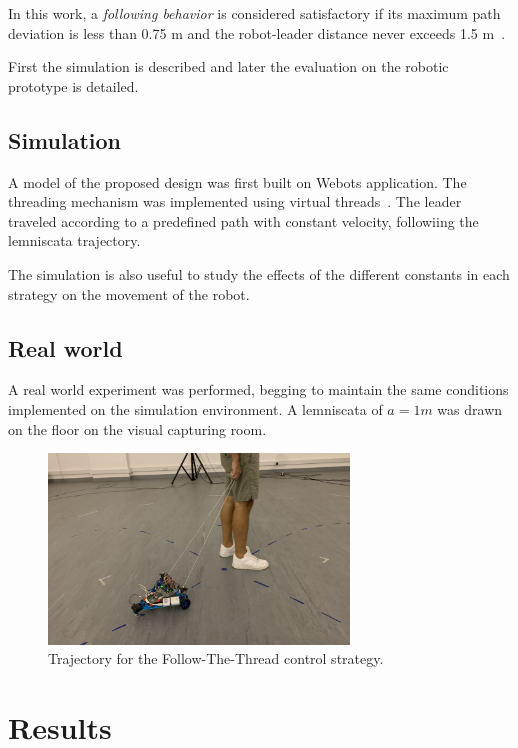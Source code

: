 \documentclass[journal]{IEEEtran}
\begin{document}
In this work, a \textit{following behavior} is considered satisfactory if its maximum path deviation is less than 0.75 m and the robot-leader distance never exceeds 1.5 m~\cite{MunozCeballos2010}.

First the simulation is described and later the evaluation on the robotic prototype is detailed.

\subsection{Simulation}

A model of the proposed design was first built on Webots application.  The threading mechanism was implemented using virtual threads~\cite{Rekleitis2001}.  The leader traveled according to a predefined path with constant velocity, followiing the lemniscata trajectory.

The simulation is also useful to study the effects of the different constants in each strategy on the movement of the robot. 

\subsection{Real world}



A real world experiment was performed, begging to maintain the same conditions implemented on the simulation environment.  A lemniscata of $  a = 1 m $ was drawn on the floor on the visual capturing room.

\begin{figure}[h!]
\centering
\includegraphics[width=8cm]{images/capture.png}
\caption{Trajectory for the Follow-The-Thread control strategy.}
\label{fig:distance_sim}
\end{figure}



\section{Results} \label{Results}
\label{results}
\end{document}
